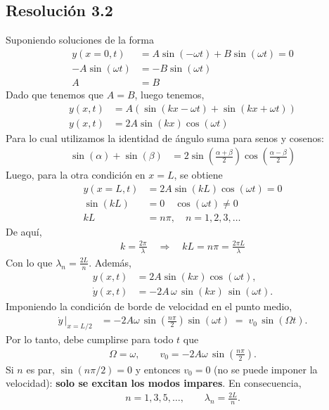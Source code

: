 \documentclass[
  11pt,
  letterpaper,
   addpoints,
   answers
  ]{exam}
\begin{document}
\begin{questions}
\begin{solution}
\subsection*{Resolución 3.2}
Suponiendo soluciones de la forma
\begin{align}
  y(x=0,t)&=A\sin(-\omega t)+B\sin(\omega t)= 0\\
          -A\sin(\omega t)&= -B\sin(\omega t)\\
          A &= B
\end{align}
Dado que tenemos que $A=B$, luego tenemos,
\begin{align}
  y(x,t)&= A\left(\sin(kx - \omega t) + \sin(kx + \omega t)\right)\\
  y(x,t)&= 2A\sin(kx)\cos(\omega t)
\end{align}
Para lo cual utilizamos la identidad de ángulo suma para senos y cosenos:
\begin{align}
  \sin(\alpha) + \sin(\beta) &= 2\sin\left(\frac{\alpha + \beta}{2}\right)\cos\left(\frac{\alpha - \beta}{2}\right)
\end{align}
Luego, para la otra condición en $x=L$, se obtiene
\begin{align}
  y(x=L,t)&=2A\sin(kL)\cos(\omega t)=0\\
  \sin(kL)&=0 \quad \cos(\omega t)\ne 0\\
  kL &= n\pi, \quad n=1,2,3,\dots
\end{align}
De aquí,
\begin{align}
  k= \frac{2\pi}{\lambda} \quad \Rightarrow \quad kL=n\pi = \frac{2\pi L}{\lambda}
\end{align}
Con lo que $\boxed{\lambda_n = \tfrac{2L}{n}}$. Además,
\begin{align}
  y(x,t) &= 2A\sin(kx)\cos(\omega t),\\
  \dot{y}(x,t) &= -2A\,\omega\,\sin(kx)\,\sin(\omega t).
\end{align}
Imponiendo la condición de borde de velocidad en el punto medio,
\begin{align}
  \left.\dot{y}\,\right|_{x = L/2} &= -2A\omega \,\sin\!\left(\frac{n \pi}{2}\right)\sin(\omega t) \;=\; v_0 \,\sin(\Omega t).
\end{align}
Por lo tanto, debe cumplirse para todo $t$ que
\begin{align}
  \Omega = \omega,\qquad v_{0} = -2A\omega \,\sin\!\left(\frac{n\pi}{2}\right).
\end{align}
Si $n$ es par, $\sin(n\pi/2)=0$ y entonces $v_0=0$ (no se puede imponer la velocidad): \textbf{solo se excitan los modos impares}. En consecuencia,
\begin{align}
  n=1,3,5,\dots,\qquad \lambda_n = \frac{2L}{n}.
\end{align}


\end{solution}
\end{questions}
\end{document}
